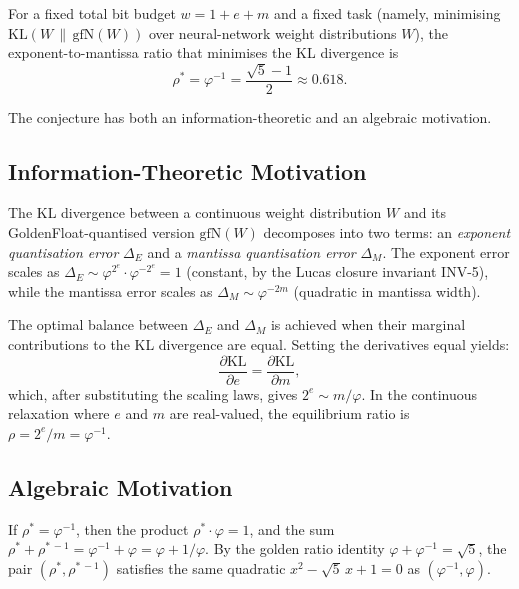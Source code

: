 \begin{conjecture}
\label{fa_05:conj:C1}
For a fixed total bit budget $w = 1 + e + m$ and a fixed task
(namely, minimising $\mathrm{KL}(W \,\|\, \mathrm{gfN}(W))$ over
neural-network weight distributions $W$), the exponent-to-mantissa
ratio that minimises the KL divergence is
\[
  \rho^{*} = \varphi^{-1} = \frac{\sqrt{5} - 1}{2} \approx 0.618.
\]
\end{conjecture}

The conjecture has both an information-theoretic and an algebraic
motivation.

\subsection{Information-Theoretic Motivation}

The KL divergence between a continuous weight distribution $W$ and its
GoldenFloat-quantised version $\mathrm{gfN}(W)$ decomposes into two
terms: an \emph{exponent quantisation error} $\Delta_{E}$ and a
\emph{mantissa quantisation error} $\Delta_{M}$. The exponent error
scales as $\Delta_{E} \sim \varphi^{2^{e}} \cdot \varphi^{-2^{e}} =
1$ (constant, by the Lucas closure invariant INV-5), while the
mantissa error scales as $\Delta_{M} \sim \varphi^{-2m}$ (quadratic
in mantissa width).

The optimal balance between $\Delta_{E}$ and $\Delta_{M}$ is achieved
when their marginal contributions to the KL divergence are equal.
Setting the derivatives equal yields:
\[
  \frac{\partial \mathrm{KL}}{\partial e} = \frac{\partial
  \mathrm{KL}}{\partial m},
\]
which, after substituting the scaling laws, gives
$2^{e} \sim m / \varphi$. In the continuous relaxation where $e$ and
$m$ are real-valued, the equilibrium ratio is
$\rho = 2^{e}/m = \varphi^{-1}$.

\subsection{Algebraic Motivation}

\begin{theorem}
\label{fa_05:thm:c1-anchor}
If $\rho^{*} = \varphi^{-1}$, then the product
$\rho^{*} \cdot \varphi = 1$, and the sum
$\rho^{*} + \rho^{*\, -1} = \varphi^{-1} + \varphi = \varphi + 1/\varphi$.
By the golden ratio identity $\varphi + \varphi^{-1} = \sqrt{5}$, the
pair $(\rho^{*}, \rho^{*\, -1})$ satisfies the same quadratic
$x^{2} - \sqrt{5}\, x + 1 = 0$ as $(\varphi^{-1}, \varphi)$.
\end{theorem}

